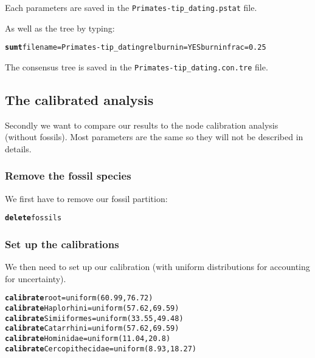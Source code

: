 \documentclass{article}\usepackage[]{graphicx}\usepackage[]{color}
\makeatletter
\newcommand{\hlstr}[1]{\textcolor[rgb]{0.192,0.494,0.8}{#1}}%
\newcommand{\hlkwd}[1]{\textcolor[rgb]{0.737,0.353,0.396}{\textbf{#1}}}%
\newenvironment{kframe}{%
 \def\at@end@of@kframe{}%
 \ifinner\ifhmode%
  \def\at@end@of@kframe{\end{minipage}}%
  \begin{minipage}{\columnwidth}%
 \fi\fi%
 \def\FrameCommand##1{\hskip\@totalleftmargin \hskip-\fboxsep
 \colorbox{shadecolor}{##1}\hskip-\fboxsep
     \hskip-\linewidth \hskip-\@totalleftmargin \hskip\columnwidth}%
 \MakeFramed {\advance\hsize-\width
   \@totalleftmargin\z@ \linewidth\hsize
   \@setminipage}}%
 {\par\unskip\endMakeFramed%
 \at@end@of@kframe}
\newenvironment{knitrout}{}{} %
\makeatother
\begin{document}
\noindent Each parameters are saved in the \texttt{Primates-tip\_dating.pstat} file.

\noindent As well as the tree by typing:
\begin{knitrout}
\color{fgcolor}\begin{kframe}
\begin{alltt}
\hlkwd{sumt} filename=\hlstr{Primates-tip_dating} relburnin=\hlstr{YES} burninfrac=\hlstr{0.25}
\end{alltt}
\end{kframe}
\end{knitrout}

\noindent The consensus tree is saved in the \texttt{Primates-tip\_dating.con.tre} file.

\subsection{The calibrated analysis}
Secondly we want to compare our results to the node calibration analysis (without fossils).
Most parameters are the same so they will not be described in details.

\subsubsection{Remove the fossil species}
We first have to remove our fossil partition:
\begin{knitrout}
\color{fgcolor}\begin{kframe}
\begin{alltt}
\hlkwd{delete} \hlstr{fossils}
\end{alltt}
\end{kframe}
\end{knitrout}

\subsubsection{Set up the calibrations}
We then need to set up our calibration (with uniform distributions for accounting for uncertainty).
\begin{knitrout}
\color{fgcolor}\begin{kframe}
\begin{alltt}
\hlkwd{calibrate} \hlstr{root}=\hlstr{uniform(60.99,76.72)}
\hlkwd{calibrate} \hlstr{Haplorhini}=\hlstr{uniform(57.62,69.59)}
\hlkwd{calibrate} \hlstr{Simiiformes}=\hlstr{uniform(33.55,49.48)}
\hlkwd{calibrate} \hlstr{Catarrhini}=\hlstr{uniform(57.62,69.59)}
\hlkwd{calibrate} \hlstr{Hominidae}=\hlstr{uniform(11.04,20.8)}
\hlkwd{calibrate} \hlstr{Cercopithecidae}=\hlstr{uniform(8.93,18.27)}
\end{alltt}
\end{kframe}
\end{knitrout}
\end{document}
